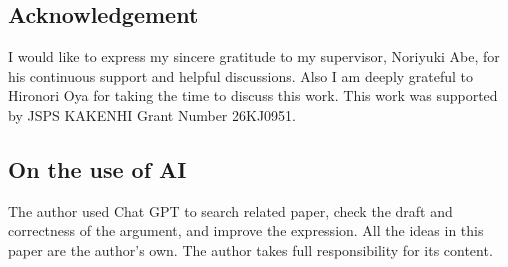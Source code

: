 \subsection*{Acknowledgement}
I would like to express my sincere gratitude to my supervisor, 
Noriyuki Abe, for his continuous support and helpful discussions. 
Also I am deeply grateful to Hironori Oya for taking the time to discuss this work. 
This work was supported by JSPS KAKENHI Grant Number 26KJ0951. 

\subsection*{On the use of AI}
The author used Chat GPT to search related paper, check the draft and correctness of the argument, 
and improve the expression. 
All the ideas in this paper are the author's own. 
The author takes full responsibility for its content.





